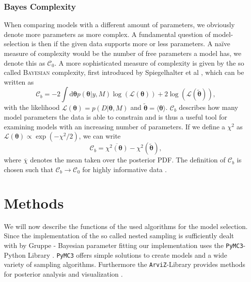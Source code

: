 \documentclass[%
 reprint,
 amsmath,amssymb,
 aps,
]{revtex4-1}
\begin{document}
\subsubsection{\textbf{Bayes Complexity}}
When comparing models with a different amount of parameters, we obviously denote more parameters as more complex. A fundamental question of model-selection is then if the given data supports more or less parameters. A na\"ive measure of complexity would be the number of free parameters a model has, we denote this as $\mathcal{C}_0$. A more sophisticated measure of complexity is given by the so called \textsc{Bayesian} complexity, first introduced by Spiegelhalter et al \cite{Spiegelhalter}, which can be written as \cite{kunz} 
\begin{equation}\label{eq:Bayes_Complexity}
	\mathcal{C}_b=-2\int \text{d}\boldsymbol{\theta} p(\boldsymbol{\theta}|y,M)\log(\mathcal{L}(\boldsymbol{\theta}))+2\log(\mathcal{L}(\boldsymbol{\tilde{\theta}})),
\end{equation}
with  the likelihood $\mathcal{L}(\boldsymbol{\theta})=p(D|\boldsymbol{\theta},M)$ and $\boldsymbol{\tilde{\theta}}=\langle\boldsymbol{\theta}\rangle$. $\mathcal{C}_b$ describes how many model parameters the data is able to constrain \cite{kunz} and is thus a useful tool for examining models with an increasing number of parameters. If we define a $\chi^2$ as $\mathcal{L}(\boldsymbol{\theta})\propto \exp(-\chi^2/2)$, we can write 
\begin{equation}\label{eq:Bayes_Complexity_alt}
	\mathcal{C}_b=\overline{\chi^2(\boldsymbol{\theta})}-\chi^2(\boldsymbol{\tilde{\theta}}),
\end{equation}
where $\overline{\chi}$ denotes the mean taken over the posterior PDF. 
The definition of $\mathcal{C}_b$ is chosen such that $\mathcal{C}_b\to\mathcal{C}_0$ for highly informative data \cite{kunz}.

\section{Methods}
\noindent We will now describe the functions of the used algorithms for the model selection. Since the implementation of the so called nested sampling is sufficiently dealt with by {\color{red} Gruppe - Bayesian parameter fitting} our implementation uses the \texttt{PyMC3}-Python Library \cite{PyMC3}.  \texttt{PyMC3} offers simple solutions to create models and a wide variety of sampling algorithms. Furthermore the \texttt{ArviZ}-Library provides methods for posterior analysis and visualization \cite{ArviZ}.
\end{document}
